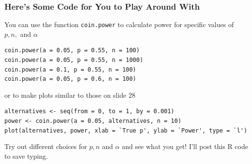 \documentclass[handout]{beamer}
\begin{document}

\begin{frame}[fragile]
\frametitle{Here's Some Code for You to Play Around With}
\footnotesize
You can use the function \texttt{coin.power} to calculate power for specific values of $p, n,$ and $\alpha$
\begin{verbatim}
coin.power(a = 0.05, p = 0.55, n = 100)
coin.power(a = 0.05, p = 0.55, n = 1000)
coin.power(a = 0.1, p = 0.55, n = 100)
coin.power(a = 0.05, p = 0.6, n = 100)
\end{verbatim}
or to make plots similar to those on slide 28
\begin{verbatim}
alternatives <- seq(from = 0, to = 1, by = 0.001)
power <- coin.power(a = 0.05, alternatives, n = 10)
plot(alternatives, power, xlab = `True p', ylab = `Power', type = `l')
\end{verbatim}
Try out different choices for $p,n$ and $\alpha$ and see what you get! I'll post this R code to save typing.

\end{frame}

\end{document}
